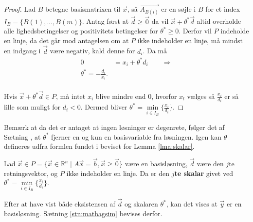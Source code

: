 \begin{proof}
Lad $B$ betegne basismatrixen til $\vec{x}$, så $\vec{A_{B(i)}}$ er en søjle i $B$ for et index $I_B =\{B(1),...,B(m)\}$. 
Antag først at $\vec{d}\geq \vec{0}$ da vil $\vec{x}+\theta^*\vec{d}$ altid overholde alle lighedsbetingelser og positivitets betingelser for $\theta^* \geq 0$. 
Derfor vil $P$ indeholde en linje, da det går mod antagelsen om at $P$ ikke indeholder en linje, må mindst en indgang i $\vec{d}$ være negativ, kald denne for $d_i$.
Da må 
\begin{align*}
 0 &= x_i + \theta^* d_i \qquad \Rightarrow
 \\ \theta^* = -\frac{d_i}{x_i}.
\end{align*} 
\\Hvis $\vec{x} + \theta^* \vec{d} \in P$, må intet $x_i$ blive mindre end $0$, hvorfor $x_l$ vælges så $\frac{x_i}{d_i}$ er så lille som muligt for $d_i < 0$. 
Dermed bliver $\theta^* = \underset{i \in I_B}{\min}\{\frac{x_i}{d_i}\}$. 
\end{proof}
Bemærk at da det er antaget at ingen løsninger er degenrete, følger det af Sætning %
, at $\theta^*$ fjerner en og kun en basisvariable fra løsningen.
Igen kan $\theta$ defineres udfra formlen fundet i beviset for Lemma \ref{lma:skalar}.
\begin{defn}[$j$te skalar]
Lad $\vec{x} \in P =\{\vec{x}\in \mathds{R}^n \mid A\vec{x}= \vec{b}, \vec{x}\geq \vec{0}\}$ være en basisløsning, $\vec{d}$ være den $j$te retningsvektor, og $P$ ikke indeholder en linje.
Da er den \textbf{$j$te skalar} givet ved $\theta^* = \underset{i \in I_B}{\min}\{\frac{x_i}{d_i}\}$.
\end{defn}
Efter at have vist både eksistensen af $\vec{d}$ og skalaren $\theta^*$, kan det vises at $\vec{y}$ er en basisløsning. 
Sætning \ref{stn:matbagsim} bevises derfor.
